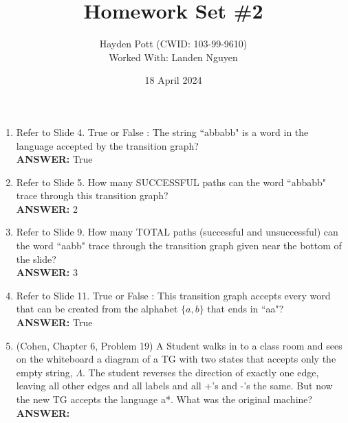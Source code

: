 \documentclass{article}
\begin{document}
\title{Homework Set \#2}
\author{Hayden Pott (CWID: 103-99-9610)\\Worked With: Landen Nguyen}
\date{18 April 2024}

\fancyhead{}
\renewcommand\headrulewidth{0pt}
\fancyfoot{}
\fancyfoot[C]{\thepage}

\pagestyle{fancy}
\maketitle

\begin{enumerate}
\section{Lecture 5}
    \item Refer to Slide 4. True or False : The string ``abbabb" is a word
        in the language accepted by the transition graph? \\
        \textbf{ANSWER:} True

    \item Refer to Slide 5. How many SUCCESSFUL paths can the word ``abbabb"
        trace through this transition graph? \\
        \textbf{ANSWER:} 2

    \item Refer to Slide 9. How many TOTAL paths (successful and
        unsuccessful) can the word ``aabb" trace through the transition graph
        given near the bottom of the slide? \\
        \textbf{ANSWER:} 3

    \item Refer to Slide 11. True or False : This transition graph accepts
        every word that can be created from the alphabet $\{a, b\}$ that ends in
        ``aa"? \\
        \textbf{ANSWER:} True

    \item (Cohen, Chapter 6, Problem 19) A Student walks in to a class room
        and sees on the whiteboard a diagram of a TG with two states that
        accepts only the empty string, $\Lambda$. The student reverses the
        direction of exactly one edge, leaving all other edges and all labels
        and all +'s and -'s the same. But now the new TG accepts the language
        a*. What was the original machine? \\
        \textbf{ANSWER:}\\
\end{enumerate}
\end{document}
